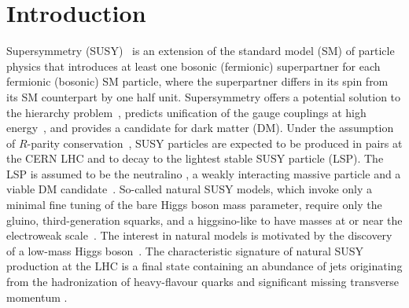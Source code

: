 
\maketitle


\section{Introduction}
\label{sec:introduction}

Supersymmetry (SUSY)~\cite{ref:SUSY-1, ref:SUSY0, ref:SUSY3,
  ref:SUSY1} is an extension of the standard model (SM) of particle
physics that introduces at least one bosonic (fermionic) superpartner
for each fermionic (bosonic) SM particle, where the superpartner
differs in its spin from its SM counterpart by one half unit.
Supersymmetry offers a potential solution to the hierarchy
problem~\cite{ref:hierarchy1, ref:hierarchy2}, predicts unification of
the gauge couplings at high energy~\cite{Dimopoulos:1981yj,
  Ibanez:1981yh, Marciano:1981un}, and provides a candidate for dark
matter (DM). Under the assumption of $R$-parity
conservation~\cite{Farrar:1978xj}, SUSY particles are expected to be
produced in pairs at the CERN LHC and to decay to the lightest stable
SUSY particle (LSP). The LSP is assumed to be the neutralino \PSGczDo,
a weakly interacting massive particle and a viable DM
candidate~\cite{Jungman:1995df, 1674-1137-38-9-090001}.  So-called
natural SUSY models, which invoke only a minimal fine tuning of the
bare Higgs boson mass parameter, require only the gluino,
third-generation squarks, and a higgsino-like \PSGczDo to have masses
at or near the electroweak scale~\cite{ref:barbierinsusy}. The
interest in natural models is motivated by the discovery of a low-mass
Higgs boson~\cite{Aad:2012tfa, Chatrchyan:2012ufa, Chatrchyan:2013lba,
  Khachatryan:2014jba, Aad:2014aba, Aad:2015zhl}. The characteristic
signature of natural SUSY production at the LHC is a final state
containing an abundance of jets originating from the hadronization of
heavy-flavour quarks and significant missing transverse momentum
\ptvecmiss.

